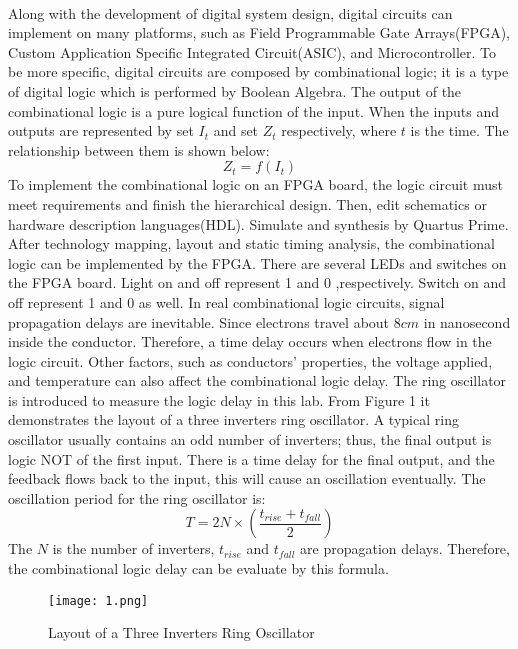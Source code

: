 \documentclass[12pt]{article}
\begin{document}
    \paragraph{}
    Along with the development of digital system design, digital circuits can implement on many platforms, such as Field Programmable Gate Arrays(FPGA), Custom Application Specific Integrated Circuit(ASIC), and Microcontroller. To be more specific, digital circuits are composed by combinational logic; it is a type of digital logic which is performed by Boolean Algebra\cite{1}. The output of the combinational logic is a pure logical function of the input\cite{2}. When the inputs and outputs are represented by set $I_{t}$ and set $Z_{t}$ respectively, where $t$ is the time. The relationship between them is shown below:
    \begin{equation}
        Z_{t}=f(I_{t})
    \end{equation}
    To implement the combinational logic on an FPGA board, the logic circuit must meet requirements and finish the hierarchical design. Then, edit schematics or hardware description languages(HDL). Simulate and synthesis by Quartus Prime. After technology mapping, layout and static timing analysis, the combinational logic can be implemented by the FPGA. There are several LEDs and switches on the FPGA board. Light on and off represent 1 and 0 ,respectively. Switch on and off represent 1 and 0 as well.
    In real combinational logic circuits, signal propagation delays are inevitable. Since electrons travel about 8$cm$ in nanosecond inside the conductor\cite{3}. Therefore, a time delay occurs when electrons flow in the logic circuit. Other factors, such as conductors' properties, the voltage applied, and temperature can also affect the combinational logic delay. The ring oscillator is introduced to measure the logic delay in this lab. From Figure 1 it demonstrates the layout of a three inverters ring oscillator. A typical ring oscillator usually contains an odd number of inverters; thus, the final output is logic NOT of the first input. There is a time delay for the final output, and the feedback flows back to the input, this will cause an oscillation eventually. The oscillation period for the ring oscillator is:
    \begin{equation}
        T=2N\times(\frac{t_{rise}+t_{fall}}{2})
    \end{equation}
    The $N$ is the number of inverters, $t_{rise}$ and $t_{fall}$ are propagation delays. Therefore, the combinational logic delay can be evaluate by this formula.
    \begin{figure}[H]
    \centering
    \texttt{[image: 1.png]}
    \caption{Layout of a Three Inverters Ring Oscillator}
    \end{figure}
    
\end{document}
